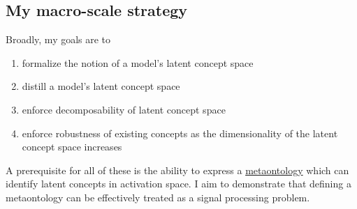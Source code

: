 
\subsection{My macro-scale strategy}
Broadly, my goals are to
\begin{enumerate}
  \item formalize the notion of a model's latent concept space
  \item distill a model's latent concept space
  \item enforce decomposability of latent concept space
  \item enforce robustness of existing concepts as the dimensionality of the latent concept space increases
\end{enumerate}

A prerequisite for all of these is the ability to express a 
\hyperlink{https://plato.stanford.edu/entries/ontological-commitment/}{metaontology}
which can identify latent concepts in activation space.
I aim to demonstrate that defining a metaontology can be effectively treated as a signal processing problem.



